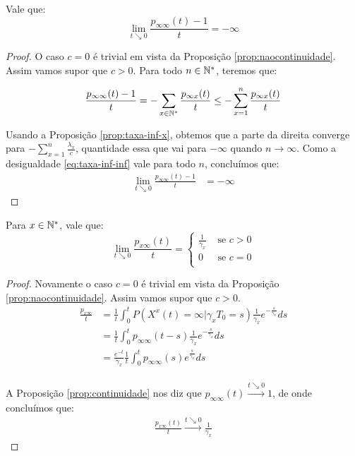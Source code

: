 \begin{proposicao}
  \label{prop:taxa-inf-inf}
  Vale que:
  \begin{displaymath}
    \lim_{t \searrow 0} \frac{p_{\infty \infty}(t) - 1}{t} = -\infty
  \end{displaymath}
\end{proposicao}
\begin{proof}
  O caso $c = 0$ é trivial em vista da Proposição
  \ref{prop:naocontinuidade}. Assim vamos supor que $c > 0$.
  Para todo $n \in {\mathbb{N^*}}$, teremos que:

  \begin{equation}
    \label{eq:taxa-inf-inf}
    \frac{p_{\infty \infty} (t) - 1}{t} = - \sum_{x \in {\mathbb{N^*}}}
    \frac{p_{\infty x} (t)}{t} \leq - \sum_{x = 1}^n \frac{p_{\infty
        x} (t)}{t}
  \end{equation}
  
  Usando a Proposição \ref{prop:taxa-inf-x}, obtemos que a parte da
  direita converge para $-\sum_{x = 1}^n \frac{\lambda_x}{c}$,
  quantidade essa que vai para $-\infty$ quando $n \to \infty$. Como a
  desigualdade \eqref{eq:taxa-inf-inf} vale para todo $n$, concluímos que:
  \begin{align*}
    \lim_{t \searrow 0}\frac{p_{\infty \infty} (t) - 1}{t} &= - \infty
  \end{align*}
\end{proof}

\begin{proposicao}
  \label{prop:taxa-x-inf}
  Para $x \in {\mathbb{N^*}}$, vale que:
  \begin{displaymath}
    \lim_{t \searrow 0} \frac{p_{x \infty}(t)}{t} = \begin{cases}
      \frac{1}{\gamma_x} & \textrm{ se } c > 0 \\
      0 & \textrm{ se } c = 0 \\
    \end{cases}
  \end{displaymath}
\end{proposicao}
\begin{proof}
  Novamente o caso $c = 0$ é trivial em vista da Proposição
  \ref{prop:naocontinuidade}. Assim vamos supor que $c > 0$.
  \begin{align*}
    \frac{p_{x \infty}}{t}
    &= \frac{1}{t} \int_0^t P(X^x (t) = \infty | \gamma_x
    T_0 = s) \frac{1}{\gamma_x}e^{-\frac{s}{\gamma_x}} ds\\
    &= \frac{1}{t} \int_0^t p_{\infty \infty} (t-s)
    \frac{1}{\gamma_x}e^{-\frac{s}{\gamma_x}} ds\\
    &= \frac{e^{-t}}{\gamma_x} \frac{1}{t} \int_0^t p_{\infty \infty} (s)
    e^{\frac{s}{\gamma_x}} ds\\
  \end{align*}

  A Proposição \ref{prop:continuidade} nos diz que $p_{\infty \infty}
  (t) \xrightarrow{t \searrow 0} 1$, de onde concluímos que:
   \begin{align*}
    \frac{p_{x \infty}(t)}{t} \xrightarrow{t \searrow 0} 
    \frac{1}{\gamma_x}
  \end{align*}
\end{proof}

